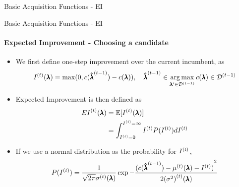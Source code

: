 \begin{frame}[t]{Basic Acquisition Functions - EI}
\begin{figure}
\end{figure}

\end{frame}
\begin{frame}[c]{Basic Acquisition Functions - EI}
\framesubtitle{Expected Improvement - Choosing a candidate}
\begin{itemize}\abovedisplayskip=0pt\belowdisplayskip=-0.5em
    \item[] We first define one-step improvement over the current incumbent, as
\smallskip
    \[
        \iter{I}(\conf) = \max(0, \cost(\incumbent[\bocount-1]) - \cost(\conf)), \quad\incumbent[\bocount-1]\in\argmax_{\conf'\in\iter[\bocount-1]{\dataset}}\boobs\in\iter[\bocount-1]{\dataset}
    \]
\pause
\medskip
    \item[] Expected Improvement is then defined as
    \begin{align*}
        \iter{EI}(\conf) &= \E[\iter{I}(\conf)]\\
        &= \int_{\iter{I}=0}^{\iter{I}=\infty}\iter{I} P(\iter{I})d\iter{I}
    \end{align*}
\pause
\medskip
    \item[]If we use a normal distribution as the probability for $\iter{I}$,
    \[
        P(\iter{I}) =
            \dfrac{1}{\sqrt{2\pi}\iter{\stddev}(\conf)}\exp{-\dfrac{{(\cost(\incumbent[\bocount-1])-\iter{\mean}(\conf)-\iter{I})}^2}{2\iter{\left(\variance\right)}(\conf)}
        }
    \]
\end{itemize}
\end{frame}
